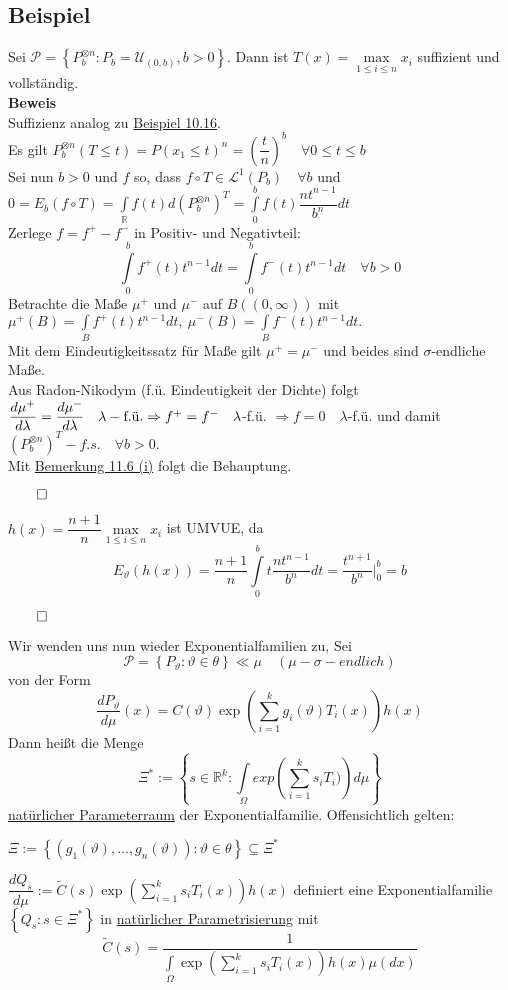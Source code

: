 \documentclass[german,10pt,oneside, fleqn, a4paper]{article}
\newcommand {\R}	{\mathbb{R}}
\newcommand{\Ra}	{\Rightarrow}
\newcommand{\sm}[2][\infty]{\sum\limits_{#2}^{#1}}
\newcommand{\brc}[1]{\left(#1\right)}
\newcommand{\brac}[1]{\left\lbrace #1\right\rbrace}
\newcommand{\QED}{\begin{flushright}$\qed$\end{flushright}}
\newcommand{\mc}[1]{\mathcal{#1}}
\newcommand{\lp}[1]{\mc{L}^{#1}}
\newcommand{\beweis}{\textbf{Beweis}\\}
\newcommand{\1}[1]{1_{#1}}
\newcommand{\2}[1]{\1{\brac{#1}}}
\newcommand{\intr}{\int\limits_\R}
\newcommand{\stuff}{{\otimes n}}
\begin{document}
\subsection{Beispiel}
\label{11.10}
Sei $\mc{P}=\brac{P_b^\stuff:P_b=\mc{U}_{(0,b)},b>0}$. Dann ist $T(x)=\max\limits_{1\leq i\leq n}x_i$ suffizient und vollständig.\\
\beweis
Suffizienz analog zu \hyperref[10.16]{Beispiel 10.16}.\\
Es gilt $P_b^\stuff(T\leq t)=P(x_1\leq t)^n=\brc{\dfrac{t}{n}}^b\quad\forall 0\leq t\leq b$\\
Sei nun $b>0$ und $f$ so, dass $f\circ T\in\lp{1}(P_b)\quad\forall b$ und \\
$0=E_b(f\circ T)=\intr f(t)d(P_b^\stuff)^T=\int\limits_0^bf(t)\dfrac{nt^{n-1}}{b^n}dt$\\Zerlege $f=f^+-f^-$ in Positiv- und Negativteil:\[
\int\limits_0^bf^+(t)t^{n-1}dt=\int\limits_0^bf^-(t)t^{n-1}dt\quad\forall b>0\]
Betrachte die Maße $\mu^+$ und $\mu^-$ auf $B((0,\infty))$ mit \\
$\mu^+(B)=\int\limits_Bf^+(t)t^{n-1}dt,\ \mu^-(B)=\int\limits_Bf^-(t)t^{n-1}dt.$\\
Mit dem Eindeutigkeitssatz für Maße gilt $\mu^+=\mu^-$ und beides sind $\sigma$-endliche Maße.\\
Aus Radon-Nikodym (f.ü. Eindeutigkeit der Dichte) folgt \\
$\dfrac{d\mu^+}{d\lambda}=\dfrac{d\mu^-}{d\lambda}\quad\lambda-\text{f.ü.}\\
\Ra f^+=f^-\quad \lambda$-f.ü. $\Ra f=0\quad\lambda$-f.ü. und damit $(P_b^\stuff)^T-f.s.\quad\forall b>0$.\\
Mit \hyperref[11.6]{Bemerkung 11.6 (i)} folgt die Behauptung.\QED

$h(x)=\dfrac{n+1}{n}\max\limits_{1\leq i\leq n}x_i$ ist UMVUE, da \[E_\vartheta(h(x))=\dfrac{n+1}{n}\int\limits_0^bt\dfrac{nt^{n-1}}{b^n}dt=\dfrac{t^{n+1}}{b^n}\Bigg\vert_0^b=b\]\QED

Wir wenden uns nun wieder Exponentialfamilien zu, Sei \[
\mc{P}=\brac{P_\vartheta:\vartheta\in\theta}\ll\mu\quad(\mu-\sigma-endlich)\]
von der Form \[
\dfrac{dP_\vartheta}{d\mu}(x)=C(\vartheta)\exp \brc{\sm[k]{i=1}g_i(\vartheta)T_i(x)}h(x)\]
Dann heißt die Menge \[
\Xi^*:=\brac{s\in\R^k:\int\limits_\Omega exp\brc{\sm[k]{i=1}s_iT_i)}d\mu}\]
\underline{natürlicher Parameterraum} der Exponentialfamilie.
Offensichtlich gelten:\begin{list}{•}{}
\item $\Xi:=\brac{(g_1(\vartheta),...,g_n(\vartheta)):\vartheta\in\theta}\subseteq\Xi^*$
\item $\dfrac{dQ_s}{d\mu}:=\tilde{C}(s)\exp\brc{\sm[k]{i=1}s_iT_i(x)}h(x)$ definiert eine Exponentialfamilie $\brac{Q_s:s\in\Xi^*}$ in \underline{natürlicher Parametrisierung} mit \[\tilde{C}(s)=\dfrac{1}{\int\limits_\Omega\exp\brc{\sm[k]{i=1}s_iT_i(x)}h(x)\mu(dx)}\]
\end{list} 
\end{document}
